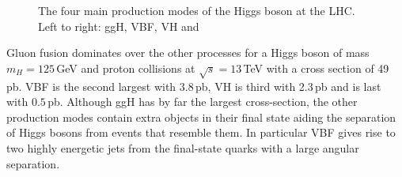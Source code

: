 \begin{figure}[h!]
\begin{center}
    \end{center}
    \caption{The four main production modes of the Higgs boson at the LHC. Left to right: ggH, VBF, VH and \ttH}
    \label{fig:theory:higgs_production}
\end{figure}
Gluon fusion dominates over the other processes for a Higgs boson of mass $m_{H}=125$\,GeV and proton collisions at $\sqrt{s} = 13$\,TeV with a cross section of 49\,pb. VBF is the second largest with 3.8\,pb, VH is third with 2.3\,pb and \ttH is last with $0.5$\,pb. Although ggH has by far the largest cross-section, the other production modes contain extra objects in their final state aiding the separation of Higgs bosons from events that resemble them. In particular VBF gives rise to two highly energetic jets from the final-state quarks with a large angular separation. 

